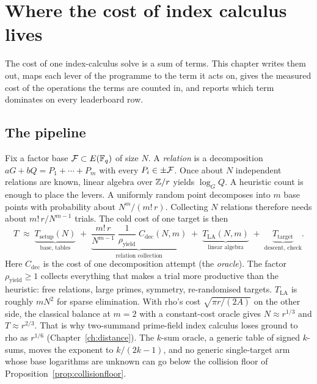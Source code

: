 \chapter{Where the cost of index calculus lives}\label{ch:model}

The cost of one index-calculus solve is a sum of terms. This chapter writes
them out, maps each lever of the programme to the term it acts on, gives
the measured cost of the operations the terms are counted in, and reports
which term dominates on every leaderboard row.

\section{The pipeline}

Fix a factor base $\mathcal{F}\subset E(\mathbb{F}_q)$ of size $N$. A \emph{relation} is a
decomposition $aG+bQ=P_1+\cdots+P_m$ with every $P_i\in\pm\mathcal{F}$. Once about
$N$ independent relations are known, linear algebra over $\mathbb{Z}/r$ yields
$\log_G Q$. A heuristic count is enough to place the levers. A uniformly
random point decomposes into $m$ base points with probability about
$N^m/(m!\,r)$. Collecting $N$ relations therefore needs about
$m!\,r/N^{m-1}$ trials. The cold cost of one target is then
\begin{equation}\label{eq:cost}
  T \;\approx\;
  \underbrace{T_{\mathrm{setup}}(N)}_{\text{base, tables}}
  \;+\;
  \underbrace{\frac{m!\,r}{N^{m-1}}\;\frac{1}{\rho_{\mathrm{yield}}}\;
  C_{\mathrm{dec}}(N,m)}_{\text{relation collection}}
  \;+\;
  \underbrace{T_{\mathrm{LA}}(N,m)}_{\text{linear algebra}}
  \;+\;
  \underbrace{T_{\mathrm{target}}}_{\text{descent, check}}.
\end{equation}
Here $C_{\mathrm{dec}}$ is the cost of one decomposition attempt (the
\emph{oracle}). The factor $\rho_{\mathrm{yield}}\ge1$ collects everything
that makes a trial more productive than the heuristic: free relations,
large primes, symmetry, re-randomised targets. $T_{\mathrm{LA}}$ is roughly
$mN^2$ for sparse elimination. With rho's cost $\sqrt{\pi r/(2A)}$ on the
other side, the classical balance at $m=2$ with a constant-cost oracle gives
$N\approx r^{1/3}$ and $T\approx r^{2/3}$. That is why two-summand
prime-field index calculus loses ground to rho as $r^{1/6}$
(Chapter~\ref{ch:distance}). The $k$-sum oracle, a generic table of
signed $k$-sums, moves the exponent to $k/(2k-1)$, and no generic
single-target arm whose base logarithms are unknown can go below the collision floor of
Proposition~\ref{prop:collisionfloor}.

